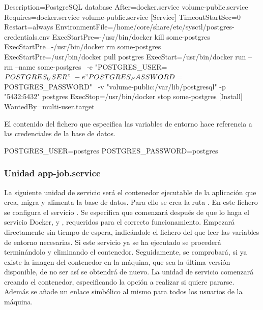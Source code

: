\begin{codelisting}
\label{code:postgresql.service}
\begin{code}
[Unit] 
  Description=PostgreSQL database 
  After=docker.service volume-public.service
  Requires=docker.service volume-public.service
[Service] 
  TimeoutStartSec=0
  Restart=always
  EnvironmentFile=/home/core/share/etc/sysctl/postgres-credentials.env
  ExecStartPre=-/usr/bin/docker kill some-postgres 
  ExecStartPre=-/usr/bin/docker rm some-postgres 
  ExecStartPre=/usr/bin/docker pull postgres 
  ExecStart=/usr/bin/docker run --rm --name some-postgres \
  -e "POSTGRES_USER=${POSTGRES_USER}" \
  -e "POSTGRES_PASSWORD=${POSTGRES_PASSWORD}" \
  -v "volume-public:/var/lib/postgresql" -p "5432:5432" postgres 
  ExecStop=/usr/bin/docker stop some-postgres 
[Install] 
  WantedBy=multi-user.target
\end{code}
\end{codelisting}

El contenido del fichero que especifica las variables de entorno hace referencia a las credenciales de la base de datos.

\begin{codelisting}
\label{code:credentials}
\begin{code}
POSTGRES_USER=postgres
POSTGRES_PASSWORD=postgres
\end{code}
\end{codelisting}

\subsubsection{Unidad app-job.service}

La siguiente unidad de servicio será el contenedor ejecutable de la aplicación que crea, migra y alimenta la base de datos. Para ello se crea la ruta . En este fichero se configura el servicio . Se especifica que comenzará después de que lo haga el servicio Docker,  y , requeridos para el correcto funcionamiento. Empezará directamente sin tiempo de espera, indicándole el fichero del que leer las variables de entorno necesarias. Si este servicio ya se ha ejecutado se procederá terminándolo y eliminando el contenedor. Seguidamente, se comprobará, si ya existe la imagen del contenedor en la máquina, que sea la última versión disponible, de no ser así se obtendrá de nuevo. La unidad de servicio comenzará creando el contenedor, especificando la opción a realizar si quiere pararse. Además se añade un enlace simbólico al mismo para todos los usuarios de la máquina. 

